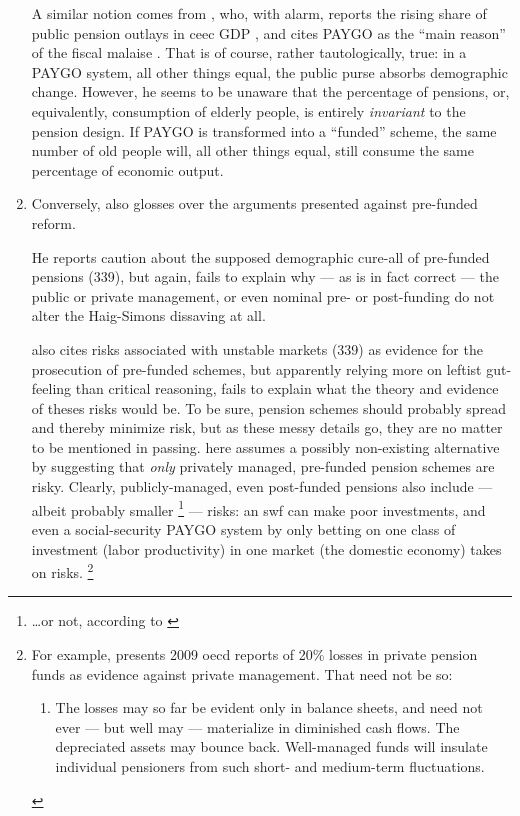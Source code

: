 \begin{enumerate}
	A similar notion comes from \cite{Bastian1998}, who, with alarm, reports the rising share of public pension outlays in \gls{ceec} GDP \citeyearpar[69]{Bastian1998}, and cites PAYGO as the ``main reason'' of the fiscal malaise \citeyearpar[69]{Bastian1998}.
	That is of course, rather tautologically, true:
	in a PAYGO system, all other things equal, the public purse absorbs demographic change.
	However, he seems to be unaware that the percentage of pensions, or, equivalently, consumption of elderly people, is entirely \emph{invariant} to the pension design.
	If PAYGO is transformed into a ``funded'' scheme, the same number of old people will, all other things equal, still consume the same percentage of economic output.

	\item Conversely, \citeauthor{Cerami2009a} also glosses over the arguments presented against pre-funded reform.

	He reports caution about the supposed demographic cure-all of pre-funded pensions (339), but again, fails to explain why --- as is in fact correct --- the public or private management, or even nominal pre- or post-funding do not alter the Haig-Simons dissaving at all.

	\citeauthor{Cerami2009a} also cites risks associated with unstable markets (339) as evidence for the prosecution of pre-funded schemes, but apparently relying more on leftist gut-feeling than critical reasoning, fails to explain what the theory and evidence of theses risks would be.
	To be sure, pension schemes should probably spread and thereby minimize risk, but as these messy details go, they are no matter to be mentioned in passing.
	\citeauthor{Cerami2009a} here assumes a possibly non-existing alternative by suggesting that \emph{only} privately managed, pre-funded pension schemes are risky.
	Clearly, publicly-managed, even post-funded pensions also include --- albeit probably smaller
	\footnote{
		\ldots or not, according to \citet[178]{Borsch-Supan2003}
	}
	--- risks:
	an \gls{swf} can make poor investments, and even a social-security PAYGO system by only betting on one class of investment (labor productivity) in one market (the domestic economy) takes on risks.
	\footnote{
		For example, \citeauthor{Cerami2009a} presents 2009 \gls{oecd} reports of 20\% losses in private pension funds as evidence against private management.
		That need not be so:
		\begin{enumerate}
			\item The losses may so far be evident only in balance sheets, and need not ever --- but well may --- materialize in diminished cash flows.
			The depreciated assets may bounce back.
			Well-managed funds will insulate individual pensioners from such short- and medium-term fluctuations.


\end{enumerate}}
\end{enumerate}
